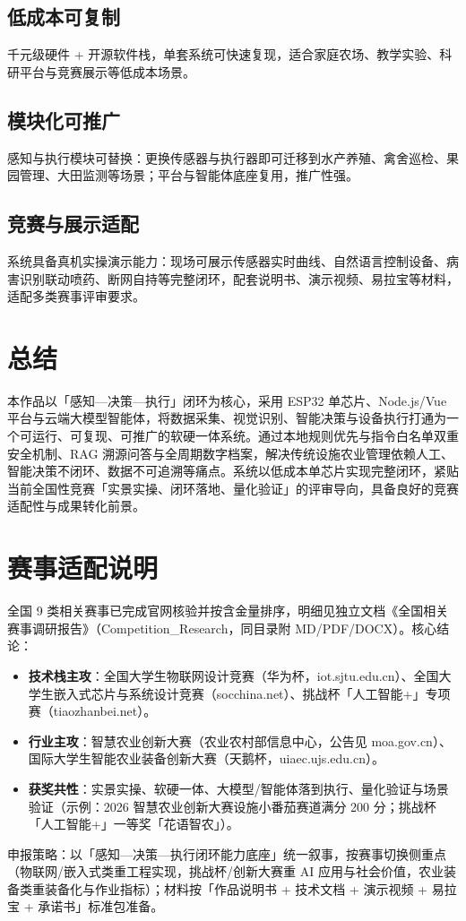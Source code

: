 ﻿\documentclass[11pt]{ctexart}
\begin{document}
\subsection{低成本可复制}
千元级硬件 + 开源软件栈，单套系统可快速复现，适合家庭农场、教学实验、科研平台与竞赛展示等低成本场景。

\subsection{模块化可推广}
感知与执行模块可替换：更换传感器与执行器即可迁移到水产养殖、禽舍巡检、果园管理、大田监测等场景；平台与智能体底座复用，推广性强。

\subsection{竞赛与展示适配}
系统具备真机实操演示能力：现场可展示传感器实时曲线、自然语言控制设备、病害识别联动喷药、断网自持等完整闭环，配套说明书、演示视频、易拉宝等材料，适配多类赛事评审要求。

\section{总结}
本作品以「感知—决策—执行」闭环为核心，采用 ESP32 单芯片、Node.js/Vue 平台与云端大模型智能体，将数据采集、视觉识别、智能决策与设备执行打通为一个可运行、可复现、可推广的软硬一体系统。通过本地规则优先与指令白名单双重安全机制、RAG 溯源问答与全周期数字档案，解决传统设施农业管理依赖人工、智能决策不闭环、数据不可追溯等痛点。系统以低成本单芯片实现完整闭环，紧贴当前全国性竞赛「实景实操、闭环落地、量化验证」的评审导向，具备良好的竞赛适配性与成果转化前景。

\appendix
\section{赛事适配说明}
全国 9 类相关赛事已完成官网核验并按含金量排序，明细见独立文档《全国相关赛事调研报告》（Competition\_Research，同目录附 MD/PDF/DOCX）。核心结论：
\begin{itemize}
  \item \textbf{技术栈主攻}：全国大学生物联网设计竞赛（华为杯，iot.sjtu.edu.cn）、全国大学生嵌入式芯片与系统设计竞赛（socchina.net）、挑战杯「人工智能+」专项赛（tiaozhanbei.net）。
  \item \textbf{行业主攻}：智慧农业创新大赛（农业农村部信息中心，公告见 moa.gov.cn）、国际大学生智能农业装备创新大赛（天鹅杯，uiaec.ujs.edu.cn）。
  \item \textbf{获奖共性}：实景实操、软硬一体、大模型/智能体落到执行、量化验证与场景验证（示例：2026 智慧农业创新大赛设施小番茄赛道满分 200 分；挑战杯「人工智能+」一等奖「花语智农」）。
\end{itemize}
申报策略：以「感知—决策—执行闭环能力底座」统一叙事，按赛事切换侧重点（物联网/嵌入式类重工程实现，挑战杯/创新大赛重 AI 应用与社会价值，农业装备类重装备化与作业指标）；材料按「作品说明书 + 技术文档 + 演示视频 + 易拉宝 + 承诺书」标准包准备。
\end{document}
